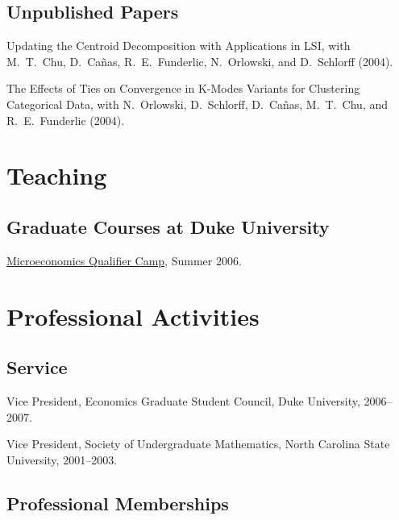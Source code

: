 \documentclass[letterpaper]{article}
\renewenvironment{itemize}{
  \begin{list}{}{
    \setlength{\leftmargin}{1em}
  }
}{
  \end{list}
}
\begin{document}
\subsection*{Unpublished Papers}

\begin{itemize}
\item Updating the Centroid Decomposition with Applications in LSI,
  with M.\ T.\ Chu, D.\ Ca\~{n}as, R.\ E.\ Funderlic, N.\ Orlowski, and
  D.\ Schlorff (2004).

\item The Effects of Ties on Convergence in K-Modes Variants for
  Clustering Categorical Data, with N.\ Orlowski, D.\ Schlorff, D.\
  Ca\~{n}as, M.\ T.\ Chu, and R.\ E.\ Funderlic (2004).
\end{itemize}


\section*{Teaching}

\subsection*{Graduate Courses at Duke University}

\begin{itemize}
\item \href{http://jblevins.org/courses/qualcamp06}{Microeconomics
    Qualifier Camp}, Summer 2006.
\end{itemize}


\section*{Professional Activities}

\subsection*{Service}

\begin{itemize}
\item Vice President, Economics Graduate Student Council, Duke University,
  2006--2007.
\item Vice President, Society of Undergraduate Mathematics, North
  Carolina State University, 2001--2003.
\end{itemize}

\subsection*{Professional Memberships}
\end{document}
